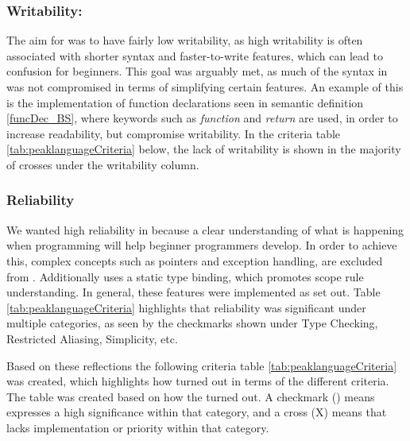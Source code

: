 \subsubsection{Writability:} 
The aim for \lang was to have fairly low writability, as high writability is often associated with shorter syntax and faster-to-write features, which can lead to confusion for beginners. This goal was arguably met, as much of the syntax in \lang was not compromised in terms of simplifying certain features. An example of this is the implementation of function declarations seen in semantic definition \ref{funcDec_BS}, where keywords such as \textit{function} and \textit{return} are used, in order to increase readability, but compromise writability. In the criteria table \ref{tab:peaklanguageCriteria} below, the lack of writability is shown in the majority of crosses under the writability column. 

 \subsubsection{Reliability} We wanted high reliability in \lang because a clear understanding of what is happening when programming will help beginner programmers develop. In order to achieve this, complex concepts such as pointers and exception handling, are excluded from \lang. Additionally \lang uses a static type binding, which promotes scope rule understanding. In general, these features were implemented as set out. Table \ref{tab:peaklanguageCriteria} highlights that reliability was significant under multiple categories, as seen by the checkmarks shown under Type Checking, Restricted Aliasing, Simplicity, etc.

Based on these reflections the following criteria table \ref{tab:peaklanguageCriteria} was created, which highlights how \lang turned out in terms of the different criteria. The table was created based on how the \lang turned out. A checkmark (\checkmark) means \lang expresses a high significance within that category, and a cross (X) means that \lang lacks implementation or priority within that category.

